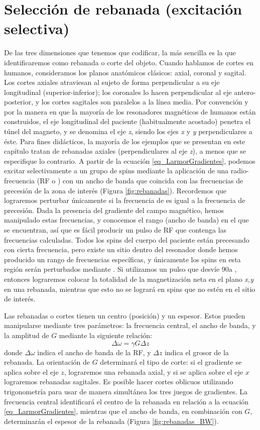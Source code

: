 \section{Selección de rebanada (excitación selectiva)}
De las tres dimensiones que tenemos que codificar, la más sencilla es la que identificaremos como rebanada o corte del objeto. Cuando hablamos de cortes en humanos, consideramos los planos anatómicos clásicos: axial, coronal y sagital. Los cortes axiales atraviesan al sujeto de forma perpendicular a su eje longitudinal (superior-inferior); los coronales lo hacen perpendicular al eje antero-posterior, y los cortes sagitales son paralelos a la línea media. Por convención y por la manera en que la mayoría de los resonadores magnéticos de humanos están construidos, el eje longitudinal del paciente (habitualmente acostado) penetra el túnel del magneto, y se denomina el eje \textit{z}, siendo los ejes \textit{x} y \textit{y} perpendiculares a éste. Para fines didácticos, la mayoría de los ejemplos que se presentan en este capítulo tratan de rebanadas axiales (perpendiculares al eje \textit{z}), a menos que se especifique lo contrario. A partir de la ecuación \ref{eq_LarmorGradientes}, podemos excitar selectivamente a un grupo de spins mediante la aplicación de una radio-frecuencia (RF o \Bone) con un ancho de banda que coincida con las frecuencias de precesión de la zona de interés (Figura \ref{fig:rebanadas}). Recordemos que lograremos perturbar \Mz únicamente si la frecuencia de \Bone es igual a la frecuencia de precesión. Dada la presencia del gradiente del campo magnético, hemos manipulado estas frecuencias, y conocemos el rango (ancho de banda) en el que se encuentran, así que es fácil producir un pulso de RF que contenga las frecuencias calculadas. Todos los spins del cuerpo del paciente están precesando con cierta frecuencia, pero existe un sitio dentro del resonador donde hemos producido un rango de frecuencias específicas, y únicamente los spins en esta región serán perturbados mediante \Bone. Si utilizamos un pulso que desvíe 90\degrees a \Mz, entonces lograremos colocar la totalidad de la magnetización neta en el plano \textit{x,y} en una rebanada, mientras que esto no se logrará en spins que no estén en el sitio de interés.

Las rebanadas o cortes tienen un centro (posición) y un espesor. Estos pueden manipularse mediante tres parámetros: la frecuencia central, el ancho de banda, y la amplitud de $G$ mediante la siguiente relación:
\begin{equation}
 \Delta\omega = \gamma G \Delta{z}
\end{equation}
donde $\Delta\omega$ indica el ancho de banda de la RF, y $\Delta{z}$ indica el grosor de la rebanada. La orientación de $G$ determinará el tipo de corte: si el gradiente se aplica sobre el eje $z$, lograremos una rebanada axial, y si se aplica sobre el eje $x$ lograremos rebanadas sagitales. Es posible hacer cortes oblicuos utilizando trigonometría para usar de manera simultánea los tres juegos de gradientes. La frecuencia central identificará el centro de la rebanada en relación a la ecuación \ref{eq_LarmorGradientes}, mientras que el ancho de banda, en combinación con $G$, determinarán el espesor de la rebanada (Figura \ref{fig:rebanadas_BW}).


